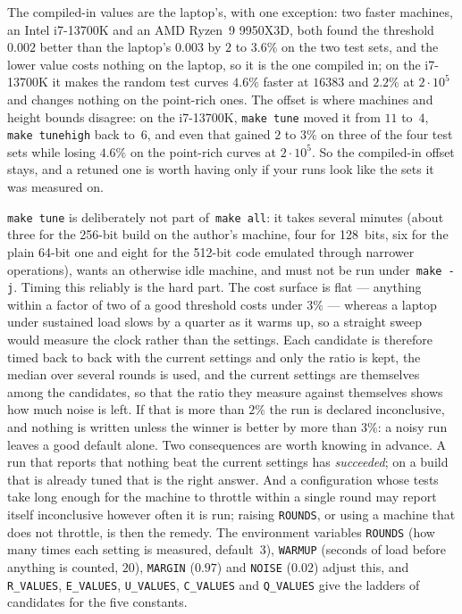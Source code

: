\documentclass[12pt,a4paper,oneside]{amsart}
\begin{document}
The compiled-in values are the laptop's, with one exception: two faster
machines, an Intel i7-13700K and an AMD Ryzen~9 9950X3D, both found the
threshold $0.002$ better than the laptop's $0.003$ by $2$ to $3.6\%$ on the
two test sets, and the lower value costs nothing on the laptop, so it is
the one compiled in; on the i7-13700K it makes the random test curves
$4.6\%$ faster at $16383$ and $2.2\%$ at $2\cdot10^5$ and changes nothing
on the point-rich ones. The offset is where machines and height bounds
disagree: on the i7-13700K, \texttt{make tune} moved it from $11$ to~$4$,
\texttt{make tunehigh} back to~$6$, and even that gained $2$ to $3\%$ on
three of the four test sets while losing $4.6\%$ on the point-rich curves
at $2\cdot10^5$. So the compiled-in offset stays, and a retuned one is
worth having only if your runs look like the sets it was measured on.

\texttt{make tune} is deliberately not part of~\texttt{make all}: it takes several minutes
(about three for the 256-bit build on the author's machine, four for
128~bits, six for the plain 64-bit one and eight for the 512-bit code
emulated through narrower operations), wants an otherwise idle machine, and
must not be run under~\texttt{make -j}. Timing this reliably is the hard part.
The cost surface is flat --- anything within a factor of two of a good
threshold costs under $3\%$ --- whereas a laptop under sustained load slows by
a quarter as it warms up, so a straight sweep would measure the clock rather
than the settings. Each candidate is therefore timed back to back with the
current settings and only the ratio is kept, the median over several rounds
is used, and the current settings are themselves among the candidates, so
that the ratio they measure against themselves shows how much noise is left.
If that is more than $2\%$ the run is declared inconclusive, and nothing is
written unless the winner is better by more than $3\%$: a noisy run leaves a
good default alone. Two consequences are worth knowing in advance. A run that
reports that nothing beat the current settings has \emph{succeeded}; on a
build that is already tuned that is the right answer. And a configuration
whose tests take long enough for the machine to throttle within a single
round may report itself inconclusive however often it is run; raising
\texttt{ROUNDS}, or using a machine that does not throttle, is then the
remedy. The environment variables \texttt{ROUNDS} (how many times each
setting is measured, default~$3$), \texttt{WARMUP} (seconds of load before
anything is counted, $20$), \texttt{MARGIN} ($0.97$) and \texttt{NOISE}
($0.02$) adjust this, and \texttt{R\_VALUES}, \texttt{E\_VALUES},
\texttt{U\_VALUES}, \texttt{C\_VALUES} and \texttt{Q\_VALUES} give the
ladders of candidates for the five constants.
\end{document}
